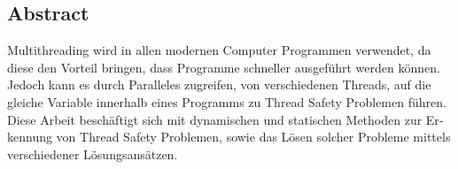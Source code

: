 \begin{otherlanguage}{ngerman}
	\chapter*{Abstract}
	Multithreading wird in allen modernen Computer Programmen verwendet, da diese den Vorteil bringen, dass Programme  schneller ausgeführt werden können. Jedoch kann es durch Paralleles zugreifen, von verschiedenen Threads, auf die gleiche Variable innerhalb eines Programms zu Thread Safety Problemen führen. Diese Arbeit beschäftigt sich mit dynamischen und statischen Methoden zur Erkennung von Thread Safety Problemen, sowie das Lösen solcher Probleme mittels verschiedener Lösungsansätzen. 
\end{otherlanguage}
